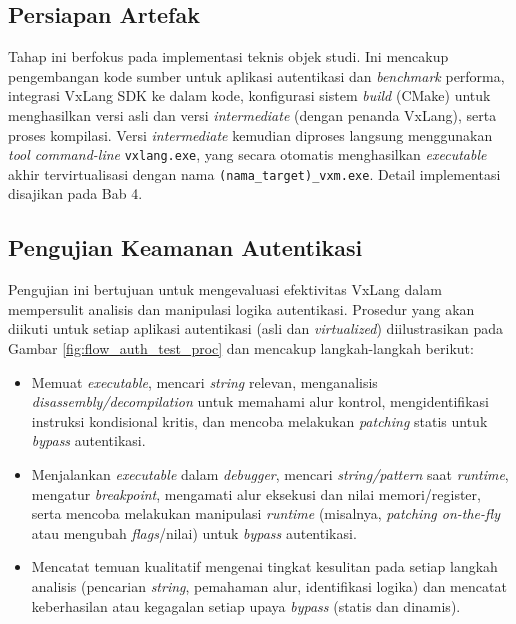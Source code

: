 \subsection{Persiapan Artefak}
Tahap ini berfokus pada implementasi teknis objek studi. Ini mencakup pengembangan kode sumber untuk aplikasi autentikasi dan \textit{benchmark} performa, integrasi VxLang SDK ke dalam kode, konfigurasi sistem \textit{build} (CMake) untuk menghasilkan versi asli dan versi \textit{intermediate} (dengan penanda VxLang), serta proses kompilasi. Versi \textit{intermediate} kemudian diproses langsung menggunakan \textit{tool command-line} \texttt{vxlang.exe}, yang secara otomatis menghasilkan \textit{executable} akhir tervirtualisasi dengan nama \texttt{(nama\_target)\_vxm.exe}. Detail implementasi disajikan pada Bab 4.

\subsection{Pengujian Keamanan Autentikasi}
Pengujian ini bertujuan untuk mengevaluasi efektivitas VxLang dalam mempersulit analisis dan manipulasi logika autentikasi. Prosedur yang akan diikuti untuk setiap aplikasi autentikasi (asli dan \textit{virtualized}) diilustrasikan pada Gambar \ref{fig:flow_auth_test_proc} dan mencakup langkah-langkah berikut:
\begin{itemize}
    \item {} Memuat \textit{executable}, mencari \textit{string} relevan, menganalisis \textit{disassembly/decompilation} untuk memahami alur kontrol, mengidentifikasi instruksi kondisional kritis, dan mencoba melakukan \textit{patching} statis untuk \textit{bypass} autentikasi.
    \item {} Menjalankan \textit{executable} dalam \textit{debugger}, mencari \textit{string/pattern} saat \textit{runtime}, mengatur \textit{breakpoint}, mengamati alur eksekusi dan nilai memori/register, serta mencoba melakukan manipulasi \textit{runtime} (misalnya, \textit{patching on-the-fly} atau mengubah \textit{flags}/nilai) untuk \textit{bypass} autentikasi.
    \item {} Mencatat temuan kualitatif mengenai tingkat kesulitan pada setiap langkah analisis (pencarian \textit{string}, pemahaman alur, identifikasi logika) dan mencatat keberhasilan atau kegagalan setiap upaya \textit{bypass} (statis dan dinamis).
\end{itemize}

